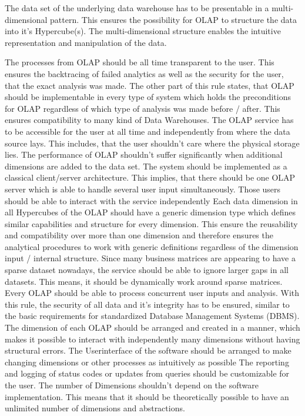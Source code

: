 \documentclass[12pt,a4paper,oneside, 
liststotoc, 					%
bibtotoc,						%
titlepage, 						%
headsepline, 					%
BCOR6mm,						%
openany,							%
]{scrreprt}
\begin{document}
The data set of the underlying data warehouse has to be presentable in a multi-dimensional pattern. This ensures the possibility for OLAP to structure the data into it's Hypercube(s). The multi-dimensional structure enables the intuitive representation and manipulation of the data.

The processes from OLAP should be all time transparent to the user. This ensures the backtracing of failed analytics as well as the security for the user, that the exact analysis was made. The other part of this rule states, that OLAP should be implementable in every type of system which holds the preconditions for OLAP regardless of which type of analysis was made before / after. This ensures compatibility to many kind of Data Warehouses.
The OLAP service has to be accessible for the user at all time and independently from where the data source lays. This includes, that the user shouldn't care where the physical storage lies.
The performance of OLAP shouldn't suffer significantly when additional dimensions are added to the data set.
The system should be implemented as a classical client/server architecture. This implies, that there should be one OLAP server which is able to handle several user input simultaneously. Those users should be able to interact with the service independently
Each data dimension in all Hypercubes of the OLAP should have a generic dimension type which defines similar capabilities and structure for every dimension. This ensure the reusability and compatibility over more than one dimension and therefore ensures the analytical procedures to work with generic definitions regardless of the dimension input / internal structure.
Since many business matrices are appearing to have a sparse dataset nowadays, the service should be able to ignore larger gaps in all datasets. This means, it should be dynamically work around sparse matrices.
Every OLAP should be able to process concurrent user inputs and analysis. With this rule, the security of all data and it's integrity has to be ensured, similar to the basic requirements for standardized Database Management Systems (DBMS).
The dimension of each OLAP should be arranged and created in a manner, which makes it possible to interact with independently many dimensions without having structural errors.
The Userinterface of the software should be arranged to make changing dimensions or other processes as intuitively as possible
The reporting and logging of status codes or updates from queries should be customizable for the user.
The number of Dimensions shouldn't depend on the software implementation. This means that it should be theoretically possible to have an unlimited number of dimensions and abstractions.
\end{document}
